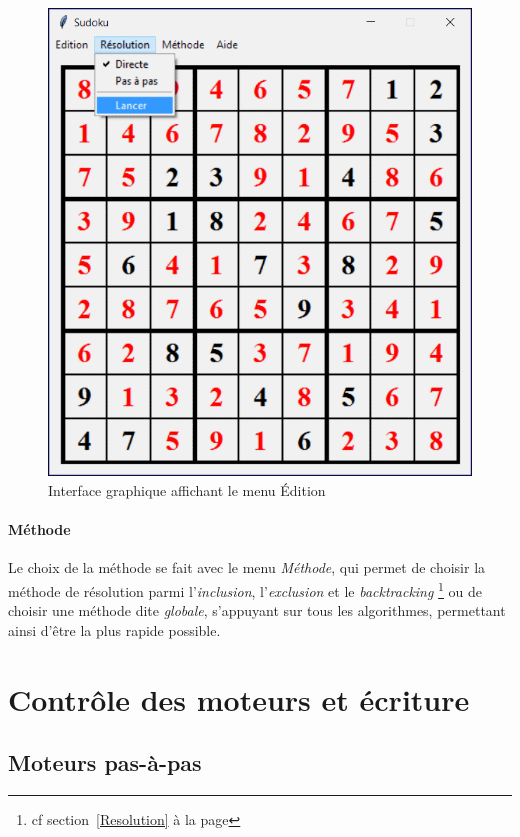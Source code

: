 \documentclass[12pt,a4paper]{report}
\begin{document}
\begin{figure}[!h]
 \center
 \includegraphics[scale=0.5]{../pictures/Sudoku_resolution}
 \caption{Interface graphique affichant le menu Édition}
\end{figure}

\paragraph{Méthode}Le choix de la méthode se fait avec le menu \emph{Méthode}, qui permet de choisir la méthode de résolution parmi l'\emph{inclusion}, l'\emph{exclusion} et le \emph{backtracking} \footnote{cf section~\ref{Resolution} à la page \pageref{Resolution}} ou de choisir une méthode dite \emph{globale}, s'appuyant sur tous les algorithmes, permettant ainsi d'être la plus rapide possible.

\section{Contrôle des moteurs et écriture}
\subsection*{Moteurs pas-à-pas}
\end{document}
